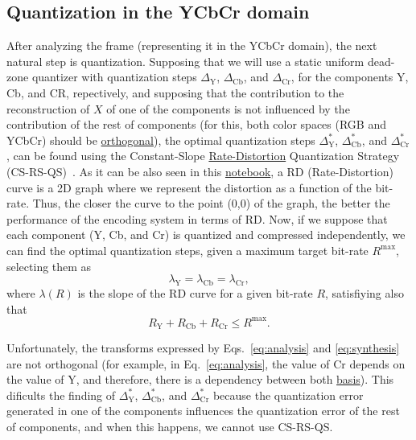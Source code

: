 \subsection{Quantization in the YCbCr domain}
After analyzing the frame (representing it in the YCbCr domain), the
next natural step is quantization. Supposing that we will use a static
uniform dead-zone quantizer with quantization steps
$\Delta_{\text{Y}}$, $\Delta_{\text{Cb}}$, and $\Delta_{\text{Cr}}$,
for the components Y, Cb, and CR, repectively, and supposing that the
contribution to the reconstruction of $X$ of one of the components is
not influenced by the contribution of the rest of components (for
this, both color spaces (RGB and YCbCr) should be
\href{https://en.wikipedia.org/wiki/Orthogonality}{orthogonal}), the
optimal quantization steps $\Delta^*_{\text{Y}}$,
$\Delta^*_{\text{Cb}}$, and $\Delta^*_{\text{Cr}}$, can be found using
the Constant-Slope
\href{https://en.wikipedia.org/wiki/Rate-distortion_theory}{Rate-Distortion}
Quantization Strategy
(CS-RS-QS)~\cite{vetterli1995wavelets,sayood2017introduction}. As it
can be also seen in this
\href{https://github.com/Sistemas-Multimedia/Sistemas-Multimedia.github.io/blob/master/study_guide/06-color_transform/performance.ipynb}{notebook},
a RD (Rate-Distortion) curve is a 2D graph where we represent the
distortion as a function of the bit-rate. Thus, the closer the curve
to the point (0,0) of the graph, the better the performance of the
encoding system in terms of RD. Now, if we suppose that each component
(Y, Cb, and Cr) is quantized and compressed independently, we can find
the optimal quantization steps, given a maximum target bit-rate
$R^{\text{max}}$, selecting them as
\begin{equation}
  \lambda_{\text{Y}} = \lambda_{\text{Cb}} = \lambda_{\text{Cr}},
\end{equation}
where $\lambda(R)$ is the slope of the RD curve for a given bit-rate
$R$, satisfiying also that
\begin{equation}
  R_{\text{Y}} + R_{\text{Cb}} + R_{\text{Cr}} \le R^{\text{max}}.
\end{equation}

Unfortunately, the transforms expressed by Eqs.~\ref{eq:analysis} and
\ref{eq:synthesis} are not orthogonal (for example, in
Eq.~\ref{eq:analysis}, the value of Cr depends on the value of Y, and
therefore, there is a dependency between both
\href{https://en.wikipedia.org/wiki/Basis_(linear_algebra)}{basis}). This
dificults the finding of $\Delta^*_{\text{Y}}$,
$\Delta^*_{\text{Cb}}$, and $\Delta^*_{\text{Cr}}$ because the
quantization error generated in one of the components influences
the quantization error of the rest of components, and when this
happens, we cannot use CS-RS-QS.

